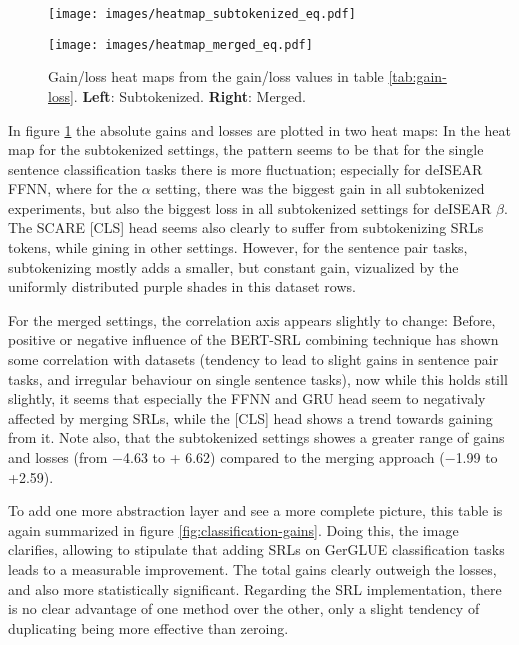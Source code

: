 \begin{figure}
  \begin{minipage}{0.45\linewidth}
  \vspace{0pt}
    \texttt{[image: images/heatmap\_subtokenized\_eq.pdf]}
  \end{minipage}
  \hfill
  \begin{minipage}{0.45\linewidth}
  \vspace{0pt}
    \texttt{[image: images/heatmap\_merged\_eq.pdf]}
  \end{minipage}
  \caption[Heatmaps subtokenizd and merged]{Gain/loss heat maps from the gain/loss values in table \ref{tab:gain-loss}. \textbf{Left}: Subtokenized. \textbf{Right}: Merged.}
  \label{fig:heatmap-gains}
\end{figure}

In figure \ref{fig:heatmap-gains} the absolute gains and losses are plotted in two heat maps:
In the heat map for the subtokenized settings, the pattern seems to be that for the single
sentence classification tasks there is more fluctuation; especially for deISEAR FFNN, where
for the $\alpha$ setting, there was the biggest gain in all subtokenized experiments, but
also the biggest loss in all subtokenized settings for deISEAR $\beta$. The SCARE [CLS] head
seems also clearly to suffer from subtokenizing SRLs tokens, while gining in other settings.
However, for the sentence pair tasks, subtokenizing mostly adds a smaller, but constant gain,
vizualized by the uniformly distributed purple shades in this dataset rows.

For the merged settings, the correlation axis appears slightly to change: Before, positive or
negative influence of the BERT-SRL combining technique has shown some correlation with datasets
(tendency to lead to slight gains in sentence pair tasks, and irregular behaviour on single
sentence tasks), now while this holds still slightly, it seems that especially the FFNN and GRU
head seem to negativaly affected by merging SRLs, while the [CLS] head shows a trend towards
gaining from it. Note also, that the subtokenized settings showes a greater range of gains and
losses (from $-$4.63 to + 6.62) compared to the merging approach ($-$1.99 to +2.59).

To add one more abstraction layer and see a more complete picture, this table is again
summarized in figure \ref{fig:classification-gains}. Doing this, the image
clarifies, allowing to stipulate that adding SRLs on GerGLUE classification tasks
leads to a measurable improvement. The total gains clearly outweigh the losses, and also
more statistically significant. Regarding the SRL implementation, there is no clear advantage
of one method over the other, only a slight tendency of duplicating being more effective
than zeroing.


